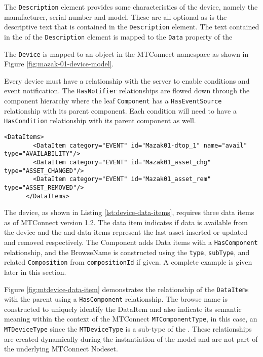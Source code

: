 The \texttt{Description} element provides some characteristics of the device, namely the manufacturer, serial-number and model. These are all optional as is the descriptive text that is contained in the \texttt{Description} element. The text contained in the  of the \texttt{Description} element is mapped to the \texttt{Data} property of the 

The \texttt{Device} is mapped to an  object in the MTConnect namespace as shown in Figure \ref{fig:mazak-01-device-model}.



Every device must have a  relationship with the server to enable conditions and event notification. The \texttt{HasNotifier} relationships are flowed down through the component hierarchy where the leaf \texttt{Component} has a \texttt{HasEventSource} relationship with its parent component. Each condition will need to have a \texttt{HasCondition} relationship with its parent component as well. 

\begin{lstlisting}[firstnumber=last,%
    caption={Device Data Items},label={lst:device-data-items}]
      <DataItems>
        <DataItem category="EVENT" id="Mazak01-dtop_1" name="avail" type="AVAILABILITY"/>
        <DataItem category="EVENT" id="Mazak01_asset_chg" type="ASSET_CHANGED"/>
        <DataItem category="EVENT" id="Mazak01_asset_rem" type="ASSET_REMOVED"/>
      </DataItems>
\end{lstlisting}

The device, as shown in Listing \ref{lst:device-data-items}, requires three data items as of MTConnect version 1.2. The  data item indicates if data is available from the device and the  and  data items represent the last asset inserted or updated and removed respectively. The Component adds Data items with a \texttt{Has\-Component} relationship, and the BrowseName is constructed using the \texttt{type}, \texttt{sub\-Type}, and related \texttt{Composition} from \texttt{compositionId} if given. A complete example is given later in this section.



Figure \ref{fig:mtdevice-data-item} demonstrates the relationship of the \texttt{Data\-Item}s with the parent  using a \texttt{Has\-Component} relationship. The browse name is constructed to uniquely identify the DataItem and also indicate its semantic meaning within the context of the MTConnect \texttt{MTComponent\-Type}, in this case, an \texttt{MTDevice\-Type} since the \texttt{MTDevice\-Type} is a sub-type of the . These relationships are created dynamically during the instantiation of the model and are not part of the underlying MTConnect Nodeset.

